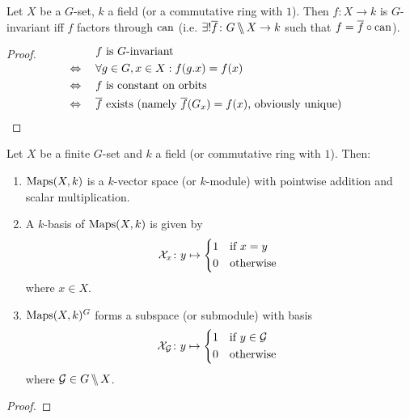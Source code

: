 \documentclass[12pt,a4paper]{scrartcl}
\theoremstyle{cplain}
\theoremstyle{cplain}
\theoremstyle{cplain}
\theoremstyle{definition}
\begin{document}
\begin{otherlanguage}{english}
\begin{lem}
  Let $X$ be a $G$-set, $k$ a field (or a commutative ring with $1$). Then $f\colon X \to k$ is $G$-invariant iff $f$ factors through $\operatorname{can}$ (i.e. $\exists! \overline f\colon G\,\backslash\!\!\backslash\, X \to k$ such that $f = \overline f \circ \operatorname{can}$).
  \begin{center}
  \end{center}
\end{lem}
\begin{proof}
  \begin{align*}
    \qedherea
    &\phantom{{}\Leftrightarrow{}}\quad \text{$f$ is $G$-invariant} \\
    &\Leftrightarrow\quad \forall g\in G, x \in X : f(g.x) = f(x) \\
    &\Leftrightarrow\quad \text{$f$ is constant on orbits} \\
    &\Leftrightarrow\quad \text{$\ol f$ exists (namely $\ol f(G_x) = f(x)$, obviously unique)}
    \qedhere
  \end{align*}
\end{proof}
\begin{lem} \label{lem:I.7}
  Let $X$ be a finite $G$-set and $k$ a field (or commutative ring with $1$). Then:
  \begin{enumerate}
    \item\label{lem:I.7:1} $\operatorname{Maps}(X,k)$ is a $k$-vector space (or $k$-module) with pointwise addition and scalar multiplication.
    \item\label{lem:I.7:2} A $k$-basis of $\operatorname{Maps}(X,k)$ is given by \[ \Xs_x\colon y \mapsto \begin{cases*} 1 & if $x = y$ \\ 0 & otherwise \end{cases*}\] where $x \in X$.
    \item\label{lem:I.7:3} $\operatorname{Maps}(X,k)^G$ forms a subspace (or submodule) with basis \[ \Xs_\Gs \colon y \mapsto \begin{cases*} 1 & if $y \in \Gs$ \\ 0 & otherwise \end{cases*} \] where $\mathcal{G} \in G\,\backslash\!\!\backslash\, X$.
  \end{enumerate}
\end{lem}
\begin{proof}

\end{proof}
\end{otherlanguage}
\end{document}
